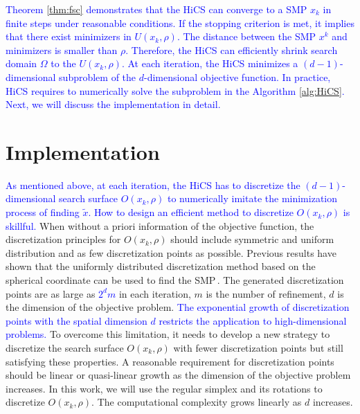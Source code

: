 \documentclass[mathpazo]{csam}
\theoremstyle{remark}
\begin{document}
\textcolor{blue}{ 
Theorem \ref{thm:fsc} demonstrates that the HiCS can converge to a SMP $x_k$ in finite
steps under reasonable conditions. If the stopping criterion is met, it implies
that there exist minimizers in $U(x_k, \rho)$. The distance between the SMP
$x^k$ and minimizers is smaller than $\rho$.
Therefore, the HiCS can efficiently shrink search domain $\Omega$ to the $U(x_k,
\rho)$.  At each iteration, the HiCS minimizes a
$(d-1)$-dimensional subproblem of the $d$-dimensional objective function.
In practice, HiCS requires to numerically solve the subproblem
in the Algorithm \ref{alg:HiCS}.
Next, we will discuss the implementation in detail. 
}




\section{Implementation}
\label{sec:implement}

\textcolor{blue}{ 
As mentioned above, at each iteration, the HiCS has to discretize 
the $(d-1)$-dimensional search surface $O(x_k,\rho)$
to numerically imitate the minimization process of finding $\tilde{x}$.
How to design an efficient method to discretize $O(x_k,\rho)$ is skillful. 
}
When without a priori information of the objective function, the discretization
principles for $O(x_k,\rho)$ should include symmetric and uniform distribution
and as few discretization points as possible.
Previous results have shown that the uniformly distributed
discretization method based on the spherical coordinate
can be used to find the SMP\,\cite{huang2017hill}. 
The generated discretization points are as large as \textcolor{blue}{$2^{d}m$} in
each iteration, $m$ is the number of refinement, $d$ is the dimension of
the objective problem. 
\textcolor{blue}{ 
The exponential growth of discretization points with the spatial dimension $d$
restricts the application to high-dimensional problems. 
}
To overcome this limitation, it needs to develop a new
strategy to discretize the search surface $O(x_k,\rho)$ with fewer
discretization points but still satisfying these properties.
A reasonable requirement for discretization points should be
linear or quasi-linear growth as the dimension of the objective problem increases.
In this work, we will use the regular simplex and its rotations to
discretize $O(x_k,\rho)$. 
The computational complexity grows linearly as $d$ increases.
\end{document}
